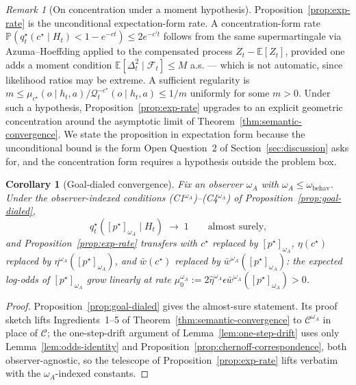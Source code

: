 \documentclass[11pt]{article}
\newtheorem{corollary}[theorem]{Corollary}
\theoremstyle{definition}
\theoremstyle{remark}
\newtheorem{remark}[theorem]{Remark}
\newcommand{\Ccal}{\mathcal{C}}
\newcommand{\Qcal}{\mathcal{Q}}
\newcommand{\E}{\mathbb{E}}
\newcommand{\Prob}{\mathbb{P}}
\begin{document}
\begin{remark}[On concentration under a moment hypothesis]
\label{rem:exp-rate-concentration}
Proposition~\ref{prop:exp-rate} is the unconditional expectation-form rate. A concentration-form rate $\Prob(q_t^\star(c^\star\mid H_t)<1-e^{-ct})\le 2e^{-c't}$ follows from the same supermartingale via Azuma--Hoeffding applied to the compensated process $Z_t-\E[Z_t]$, provided one adds a moment condition $\E[\Delta_t^2\mid\mathcal F_t]\le M$ a.s. --- which is not automatic, since likelihood ratios may be extreme. A sufficient regularity is $m\le\mu_{c^\star}(o\mid h_t,a)/\Qcal_t^{-c^\star}(o\mid h_t,a)\le 1/m$ uniformly for some $m>0$. Under such a hypothesis, Proposition~\ref{prop:exp-rate} upgrades to an explicit geometric concentration around the asymptotic limit of Theorem~\ref{thm:semantic-convergence}. We state the proposition in expectation form because the unconditional bound is the form Open Question~2 of Section~\ref{sec:discussion} asks for, and the concentration form requires a hypothesis outside the problem box.
\end{remark}

\begin{corollary}[Goal-dialed convergence]
\label{cor:goal-dialed-payoff}
Fix an observer $\omega_A$ with $\omega_A\le\omega_{\mathrm{behav}}$. Under the observer-indexed conditions \textup{(C1$^{\omega_A}$)--(C4$^{\omega_A}$)} of Proposition~\ref{prop:goal-dialed},
\[
q_t^\star([p^\star]_{\omega_A}\mid H_t)\;\longrightarrow\;1
\qquad\text{almost surely,}
\]
and Proposition~\ref{prop:exp-rate} transfers with $c^\star$ replaced by $[p^\star]_{\omega_A}$, $\eta(c^\star)$ replaced by $\eta^{\omega_A}([p^\star]_{\omega_A})$, and $\bar w(c^\star)$ replaced by $\bar w^{\omega_A}([p^\star]_{\omega_A})$: the expected log-odds of $[p^\star]_{\omega_A}$ grow linearly at rate $\mu_0^{\omega_A}:=2\hat\eta^{\omega_A}\epsilon\bar w^{\omega_A}([p^\star]_{\omega_A})>0$.
\end{corollary}

\begin{proof}
Proposition~\ref{prop:goal-dialed} gives the almost-sure statement. Its proof sketch lifts Ingredients~1--5 of Theorem~\ref{thm:semantic-convergence} to $\Ccal^{\omega_A}$ in place of $\Ccal$; the one-step-drift argument of Lemma~\ref{lem:one-step-drift} uses only Lemma~\ref{lem:odds-identity} and Proposition~\ref{prop:chernoff-correspondence}, both observer-agnostic, so the telescope of Proposition~\ref{prop:exp-rate} lifts verbatim with the $\omega_A$-indexed constants.
\end{proof}
\end{document}
